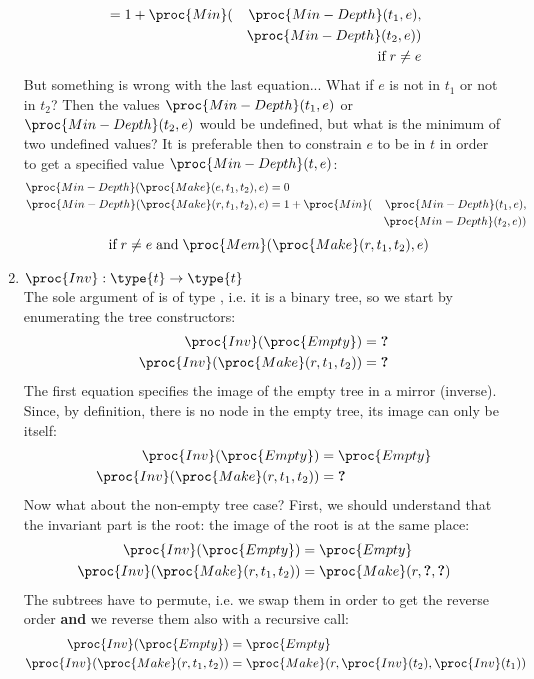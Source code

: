 \begin{enumerate}
\begin{align*}
       &= 1 + \proc{Min} (&\proc{Min-Depth} (t_1, e),\\
       && \proc{Min-Depth} (t_2, e))\\
       && \text{if} \; r \neq e
     \end{align*}
     But something is wrong with the last equation... What if \(e\) is
     not in \(t_1\) or not in \(t_2\)? Then the values
     \(\proc{Min-Depth} (t_1, e)\) or \(\proc{Min-Depth} (t_2, e)\)
     would be undefined, but what is the minimum of two undefined
     values? It is preferable then to constrain \(e\) to be in \(t\)
     in order to get a specified value \(\proc{Min-Depth} (t, e)\):
     \begin{align*}
          \proc{Min-Depth} (\proc{Make} (e, t_1, t_2), e) 
       &= 0\\
          \proc{Min-Depth} (\proc{Make} (r, t_1, t_2), e) 
       &= 1 + \proc{Min} (&\proc{Min-Depth} (t_1, e),\\
       && \proc{Min-Depth} (t_2, e))
     \end{align*}
      \hfill{\(\qquad\qquad\qquad\text{if} \; r \neq e \; \text{and}
        \; \proc{Mem} (\proc{Make} (r, t_1, t_2), e)\)}
       
     \item \(\proc{Inv}: \type{t} \rightarrow \type{t}\)\\ The sole
       argument of  is of type , i.e. it is a binary
       tree, so we start by enumerating the tree constructors:
     \begin{align*}
       \proc{Inv} (\proc{Empty}) &= \textbf{?}\\
       \proc{Inv} (\proc{Make} (r, t_1, t_2)) &= \textbf{?}
     \end{align*}
     The first equation specifies the image of the empty tree in a
     mirror (inverse). Since, by definition, there is no node in the
     empty tree, its image can only be itself:
     \begin{align*}
       \proc{Inv} (\proc{Empty}) &= \proc{Empty}\\
       \proc{Inv} (\proc{Make} (r, t_1, t_2)) &= \textbf{?}
     \end{align*}
     Now what about the non-empty tree case? First, we should
     understand that the invariant part is the root: the image of the
     root is at the same place:
     \begin{align*}
       \proc{Inv} (\proc{Empty}) &= \proc{Empty}\\
       \proc{Inv} (\proc{Make} (r, t_1, t_2)) &= \proc{Make} (r,
       \textbf{?}, \textbf{?})
     \end{align*}
     The subtrees have to permute, i.e. we swap them in order to get
     the reverse order \textbf{and} we reverse them also with a
     recursive call:
     \begin{align*}
       \proc{Inv} (\proc{Empty}) &= \proc{Empty}\\
       \proc{Inv} (\proc{Make} (r, t_1, t_2)) &= \proc{Make} (r,
       \proc{Inv} (t_2), \proc{Inv} (t_1))
     \end{align*}
 

\end{enumerate}
